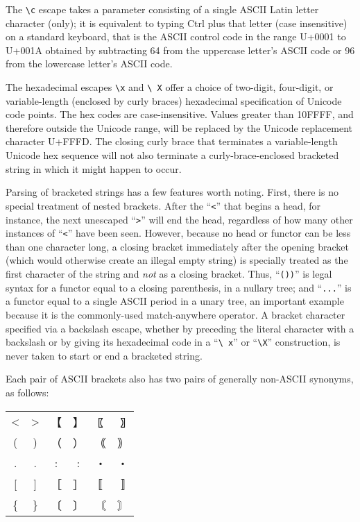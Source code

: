 \documentclass[twocolumn]{report}
\begin{document}
The \texttt{\textbackslash c} escape takes a parameter consisting of a
single ASCII Latin letter character (only); it is equivalent to typing Ctrl
plus that letter (case insensitive) on a standard keyboard, that is the
ASCII control code in the range U+0001 to U+001A obtained by subtracting 64
from the uppercase letter's ASCII code or 96 from the lowercase letter's
ASCII code.

The hexadecimal escapes \texttt{\textbackslash x} and \texttt{\textbackslash
X} offer a choice of two-digit, four-digit, or variable-length (enclosed by
curly braces) hexadecimal specification of Unicode code points.  The hex
codes are case-insensitive.  Values greater than 10FFFF, and therefore
outside the Unicode range, will be replaced by the Unicode replacement
character U+FFFD.  The closing curly brace that terminates a variable-length
Unicode hex sequence will not also terminate a curly-brace-enclosed
bracketed string in which it might happen to occur.

Parsing of bracketed strings has a few features worth noting.  First, there
is no special treatment of nested brackets.  After the ``\texttt{<}'' that
begins a head, for instance, the next unescaped ``\texttt{>}'' will end the
head, regardless of how many other instances of ``\texttt{<}'' have been
seen.  However, because no head or functor can be less than one character
long, a closing bracket immediately after the opening bracket (which would
otherwise create an illegal empty string) is specially treated as the first
character of the string and \emph{not} as a closing bracket.  Thus,
``\texttt{())}'' is legal syntax for a functor equal to a closing
parenthesis, in a nullary tree; and ``\texttt{...}'' is a functor equal to a
single ASCII period in a unary tree, an important example because it is the
commonly-used match-anywhere operator.  A bracket character specified via a
backslash escape, whether by preceding the literal character with a
backslash or by giving its hexadecimal code in a ``\texttt{\textbackslash
x}'' or ``\texttt{\textbackslash X}'' construction, is never taken to start
or end a bracketed string.

Each pair of ASCII brackets also has two pairs of generally
non-ASCII synonyms, as
follows:

{\ttfamily\hspace*{\fill}
\begin{tabular}{cccccc}
  <&>&【&】&〖&〗\\
  (&)&（&）&｟&｠\\
  .&.&:&:&・&・\\\relax
  [&]&［&］&〚&〛\\
  \{&\}&〔&〕&〘&〙
\end{tabular}
\hspace*{\fill}\par}
\end{document}
